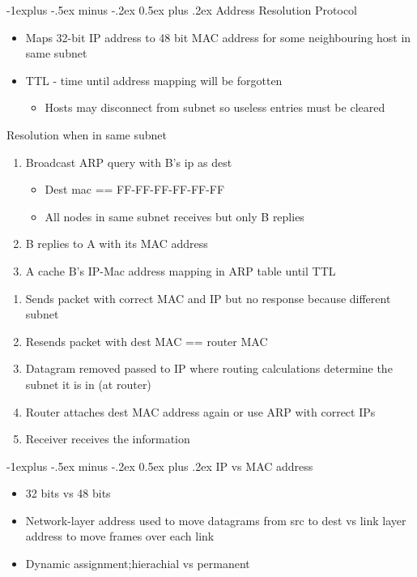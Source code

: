 \documentclass{article}
\makeatletter
\renewcommand{\subsection}{\@startsection{subsection}{2}{0mm}%
    {-1explus -.5ex minus -.2ex}%
    {0.5ex plus .2ex}%
{\normalfont\normalsize\bfseries}}
\makeatother
\begin{document}
\begin{multicols*}{4}
\subsection{Address Resolution Protocol}
\begin{itemize}
	\item Maps 32-bit IP address to 48 bit MAC address for some neighbouring host in same subnet
	\item TTL - time until address mapping will be forgotten
	\begin{itemize}
		\item Hosts may disconnect from subnet so useless entries must be cleared
	\end{itemize}
\end{itemize}
Resolution when in same subnet
\begin{enumerate}
	\item Broadcast ARP query with B's ip as dest
	\begin{itemize}
		\item Dest mac == FF-FF-FF-FF-FF-FF
		\item All nodes in same subnet receives but only B replies
	\end{itemize}
	\item B replies to A with its MAC address
	\item A cache B's IP-Mac address mapping in ARP table until TTL
\end{enumerate}
\begin{enumerate}
	\item Sends packet with correct MAC and IP but no response because different subnet
	\item Resends packet with dest MAC == router MAC
	\item Datagram removed passed to IP where routing calculations determine the subnet it is in (at router)
	\item Router attaches dest MAC address again or use ARP with correct IPs
	\item Receiver receives the information
\end{enumerate}
\subsection{IP vs MAC address}
\begin{itemize}
	\item 32 bits vs 48 bits
	\item Network-layer address used to move datagrams from src to dest vs link layer address to move frames over each link
	\item Dynamic assignment;hierachial vs permanent
\end{itemize}


\end{multicols*}
\end{document}
